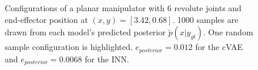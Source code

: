 \documentclass[conference]{IEEEtran}
\begin{document}
\begin{figure}[tbh]
\centering

    \caption{Configurations of a planar manipulator with $6$ revolute joints and end-effector position at $(x, y) = [3.42, 0.68]$. 1000 samples are drawn from each model's predicted posterior $\tilde{p}(x | y_{gt})$. One random sample configuration is highlighted. $e_{posterior} = 0.012$ for the cVAE and $e_{posterior} = 0.0068$ for the INN.}
    \label{fig:posterior:6dof}
\end{figure}
\end{document}
